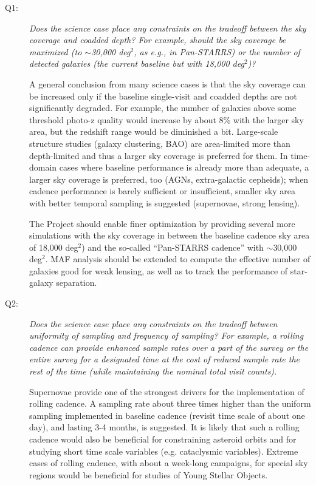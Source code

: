 \begin{description}

\item[Q1:] {\it Does the science case place any constraints on the
tradeoff between the sky coverage and coadded depth? For example, should
the sky coverage be maximized (to $\sim$30,000 deg$^2$, as e.g., in
Pan-STARRS) or the number of detected galaxies (the current baseline but
with 18,000 deg$^2$)?}

A general conclusion from many science cases is that the sky coverage
can be increased only if the baseline single-visit and coadded depths
are not significantly degraded. For example, the number of galaxies above
some threshold photo-z quality would increase by about 8\% with the larger
sky area, but the redshift range would be diminished a bit. Large-scale 
structure studies (\eg galaxy clustering, BAO) are 
area-limited more than depth-limited and thus a larger sky coverage is 
preferred for them. In time-domain cases where baseline performance is already 
more than adequate, a larger sky coverage is preferred, too (AGNs, 
extra-galactic cepheids); when cadence performance is barely sufficient 
or insufficient, smaller sky area with better temporal sampling is suggested 
(supernovae, strong lensing). 

The Project should enable finer optimization by providing several more
simulations with the sky coverage in between the baseline cadence sky
area of 18,000 deg$^2$) and the so-called ``Pan-STARRS cadence'' with
$\sim$30,000 deg$^2$. MAF analysis should be extended to compute the
effective number of galaxies good for weak lensing, as well as to track
the performance of star-galaxy separation.


\item[Q2:] {\it Does the science case place any constraints on the
tradeoff between uniformity of sampling and frequency of  sampling? For
example, a rolling cadence can provide enhanced sample rates over a part
of the survey or the entire survey for a designated time at the cost of
reduced sample rate the rest of the time (while maintaining the nominal
total visit counts).}

Supernovae provide one of the strongest drivers for the implementation of
rolling cadence. A sampling rate about three times higher than the
uniform sampling implemented in baseline cadence (revisit time scale of
about one day), and lasting 3-4 months, is suggested. It is likely that
such a rolling cadence would also be beneficial for constraining
asteroid orbits and for studying short time scale variables (e.g.
cataclysmic variables). Extreme cases of rolling cadence, with about a
week-long campaigns, for special sky regions would be beneficial for
studies of Young Stellar Objects.


\end{description}
